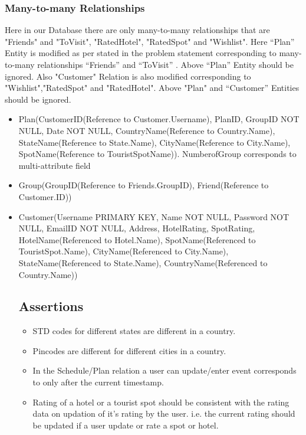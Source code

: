 \documentclass[11pt]{article}
\begin{document}
\subsubsection{Many-to-many Relationships}
Here in our Database there are only many-to-many relationships that are "Friends" and "ToVisit", "RatedHotel", "RatedSpot" and "Wishlist". Here “Plan” Entity is modified as per stated in the problem statement corresponding to many-to-many relationships “Friends” and “ToVisit” . Above “Plan” Entity should be ignored. Also "Customer" Relation is also modified corresponding to "Wishlist","RatedSpot" and "RatedHotel". Above "Plan" and “Customer” Entities should be ignored.
\begin{itemize}
\item Plan(CustomerID(Reference to Customer.Username), PlanID, GroupID NOT NULL, Date NOT NULL, CountryName(Reference to Country.Name), StateName(Reference to State.Name), CityName(Reference to City.Name), SpotName(Reference to TouristSpotName)). NumberofGroup corresponds to multi-attribute field

\item Group(GroupID(Reference to Friends.GroupID), Friend(Reference to Customer.ID))

\item Customer(Username PRIMARY KEY, Name NOT NULL, Password NOT NULL, EmailID NOT NULL, Address, HotelRating, SpotRating, HotelName(Referenced to Hotel.Name), SpotName(Referenced to TouristSpot.Name), CityName(Referenced to City.Name), StateName(Referenced to State.Name), CountryName(Referenced to Country.Name))

\subsection*{Assertions}
\begin{itemize}
\item STD codes for different states are different in a country.
\item Pincodes are different for different cities in a country.
\item In the Schedule/Plan relation a user can update/enter event corresponds to  only after the current timestamp.
\item Rating of a hotel or a tourist spot should be consistent with the rating data on updation of it’s rating by the user. i.e. the current rating should be updated if a user update or rate a spot or hotel.

\end{itemize}
\end{itemize}
\end{document}

